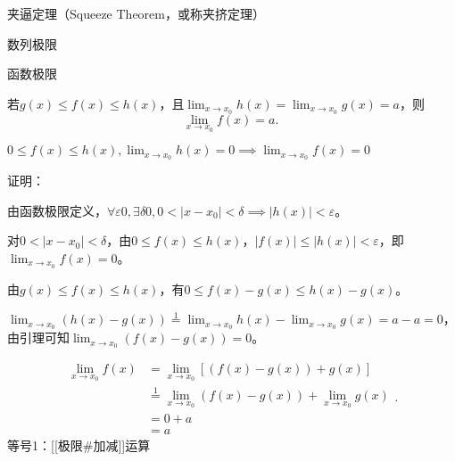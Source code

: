 
\begin{issues}
\issueDraft
\end{issues}
夹逼定理（Squeeze Theorem，或称夹挤定理）

数列极限

函数极限

若$g(x)\leq f(x)\leq h(x)$，且$\lim _{x\to x_0}h(x)=\lim _{x\to x_0}g(x)=a$，则
\begin{equation}
\lim _{x\to x_0}f(x)=a.~
\end{equation}

$0\leq f(x)\leq h(x),\lim _{x\to x_0}h(x)=0\implies\lim _{x\to x_0}f(x)=0$
 
 证明：
 
 由函数极限定义，$\forall\varepsilon 0,\exists\delta 0,0<|x-x_0|<\delta\implies|h(x)|<\varepsilon$。
 
 对$0<|x-x_0|<\delta$，由$0\leq f(x)\leq h(x)$，$|f(x)|\leq |h(x)|<\varepsilon$，即$\lim _{x\to x_0}f(x)=0$。

 由$g(x)\leq f(x)\leq h(x)$，有$0\leq f(x)-g(x)\leq h(x)-g(x)$。
 
 $\lim _{x\to x_0}(h(x)-g(x))\overset{\mathrm{1}}{=}\lim _{x\to x_0}h(x)-\lim _{x\to x_0}g(x)=a-a=0$，由引理可知$\lim _{x\to x_0}(f(x)-g(x))=0$。
 
 $$\begin{align*} \lim _{x\to x_0}f(x) &= \lim _{x\to x_0}[(f(x)-g(x))+g(x)] \\ 
 &\overset{\mathrm{1}}{=} \lim _{x\to x_0}(f(x)-g(x))+\lim _{x\to x_0}g(x) \\ 
 &= 0+a\\ 
 &=a \end{align*}.~$$
 等号1：[[极限#加减]]运算